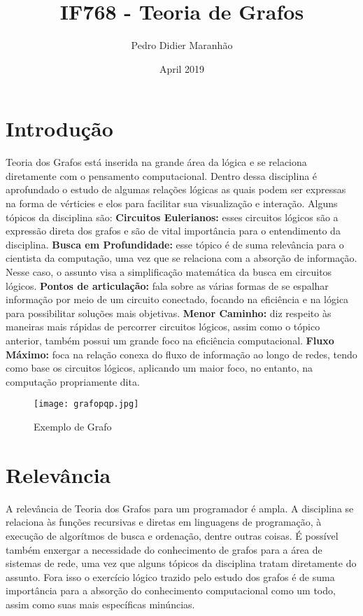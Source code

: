 \documentclass{article}
\title{IF768 - Teoria de Grafos}
\author{Pedro Didier Maranhão}
\date{April 2019}
\begin{document}
\maketitle

\section{Introdução}
Teoria dos Grafos está inserida na grande área da lógica e se relaciona diretamente com o pensamento computacional. Dentro dessa disciplina é aprofundado o estudo de algumas relações lógicas as quais podem ser expressas na forma de vérticies e elos para facilitar sua visualização e interação. Alguns tópicos da disciplina são: \newline \newline
\textbf{Circuitos Eulerianos:} esses circuitos lógicos são a expressão direta dos grafos e são de vital importância para o entendimento da disciplina. \citep{referenciasdisciplina} \newline
\textbf{Busca em Profundidade:} esse tópico é de suma relevância para o cientista da computação, uma vez que se relaciona com a absorção de informação. Nesse caso, o assunto visa a simplificação matemática da busca em circuitos lógicos. \citep{referenciasdisciplina2} \newline
\textbf{Pontos de articulação:} fala sobre as várias formas de se espalhar informação por meio de um circuito conectado, focando na eficiência e na lógica para possibilitar soluções mais objetivas. \citep{referenciasdisciplina3} \newline
\textbf{Menor Caminho:} diz respeito às maneiras mais rápidas de percorrer circuitos lógicos, assim como o tópico anterior, também possui um grande foco na eficiência computacional. \citep{referenciasdisciplina4} \newline
\textbf{Fluxo Máximo:} foca na relação conexa do fluxo de informação ao longo de redes, tendo como base os circuitos lógicos, aplicando um maior foco, no entanto, na computação propriamente dita. \citep{referenciasdisciplina5}

\begin{figure}[h!]
\centering
\texttt{[image: grafopqp.jpg]}
\caption{Exemplo de Grafo}
\label{fig:grafolol}
\end{figure}

\section{Relevância}
A relevância de Teoria dos Grafos para um programador é ampla. A disciplina se relaciona às funções recursivas e diretas em linguagens de programação, à execução de algorítmos de busca e ordenação, dentre outras coisas. É possível também enxergar a necessidade do conhecimento de grafos para a área de sistemas de rede, uma vez que alguns tópicos da disciplina tratam diretamente do assunto. Fora isso o exercício lógico trazido pelo estudo dos grafos é de suma importância para a absorção do conhecimento computacional como um todo, assim como suas mais específicas minúncias.
\end{document}
